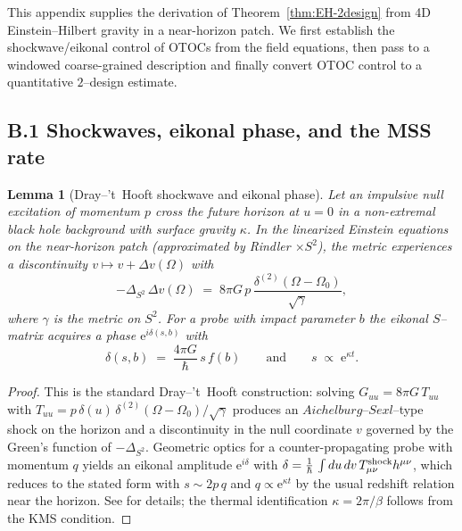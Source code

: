 \documentclass[aps,prd,preprint,onecolumn,superscriptaddress,nofootinbib,longbibliography,floatfix,11pt,showpacs,showkeys]{revtex4-2}
\theoremstyle{plain}
\newtheorem{lemma}[theorem]{Lemma}
\theoremstyle{definition}
\theoremstyle{remark}
\begin{document}
This appendix supplies the derivation of Theorem~\ref{thm:EH-2design} from 4D Einstein--Hilbert gravity in a near-horizon patch.
We first establish the shockwave/eikonal control of OTOCs from the field equations, then pass to a windowed coarse-grained description and finally convert OTOC control to a quantitative $2$--design estimate.

\subsection*{B.1 Shockwaves, eikonal phase, and the MSS rate}
\begin{lemma}[Dray--'t~Hooft shockwave and eikonal phase]
\label{lem:shockwave}
Let an impulsive null excitation of momentum $p$ cross the future horizon at $u{=}0$ in a non-extremal black hole background with surface gravity $\kappa$.
In the linearized Einstein equations on the near-horizon patch (approximated by Rindler $\times S^2$), the metric experiences a discontinuity $v\mapsto v+\Delta v(\Omega)$ with
\[
-\Delta_{S^2}\,\Delta v(\Omega)\;=\;8\pi G\,p\,\frac{\delta^{(2)}(\Omega-\Omega_0)}{\sqrt{\gamma}}\!,
\]
where $\gamma$ is the metric on $S^2$.
For a probe with impact parameter $b$ the eikonal $S$--matrix acquires a phase $\mathrm{e}^{i\delta(s,b)}$ with
\[
\delta(s,b) \;=\; \frac{4\pi G}{\hbar}\,s\,f(b)
\qquad\text{and}\qquad s \;\propto\; \mathrm{e}^{\kappa t}.
\]
\end{lemma}
\begin{proof}
This is the standard Dray--'t~Hooft construction: solving $G_{uu}=8\pi G\,T_{uu}$ with $T_{uu}=p\,\delta(u)\,\delta^{(2)}(\Omega-\Omega_0)/\sqrt{\gamma}$ produces an $Aichelburg$--$Sexl$--type shock on the horizon and a discontinuity in the null coordinate $v$ governed by the Green's function of $-\Delta_{S^2}$.
Geometric optics for a counter-propagating probe with momentum $q$ yields an eikonal amplitude $\mathrm{e}^{i \delta}$ with $\delta=\frac{1}{\hbar}\,\int du\,dv\, T^{\rm shock}_{\mu\nu}h^{\mu\nu}$, which reduces to the stated form with $s\sim 2p\,q$ and $q\propto \mathrm{e}^{\kappa t}$ by the usual redshift relation near the horizon. See \cite{tHooft:1985} for details; the thermal identification $\kappa=2\pi/\beta$ follows from the KMS condition.
\end{proof}
\end{document}
